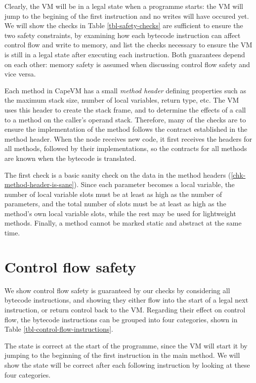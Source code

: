 Clearly, the VM will be in a legal state when a programme starts: the VM will jump to the begining of the first instruction and no writes will have occured yet. We will show the checks in Table \ref{tbl-safety-checks} are sufficient to ensure the two safety constraints, by examining how each bytecode instruction can affect control flow and write to memory, and list the checks necessary to ensure the VM is still in a legal state after executing each instruction. Both guarantees depend on each other: memory safety is assumed when discussing control flow safety and vice versa.

Each method in CapeVM has a small \emph{method header} defining properties such as the maximum stack size, number of local variables, return type, etc. The VM uses this header to create the stack frame, and to determine the effects of a call to a method on the caller's operand stack. Therefore, many of the checks are to ensure the implementation of the method follows the contract established in the method header. When the node receives new code, it first receives the headers for all methods, followed by their implementations, so the contracts for all methods are known when the bytecode is translated.

The first check is a basic sanity check on the data in the method headers (\ref{chk-method-header-is-sane}). Since each parameter becomes a local variable, the number of local variable slots must be at least as high as the number of parameters, and the total number of slots must be at least as high as the method's own local variable slots, while the rest may be used for lightweight methods. Finally, a method cannot be marked static and abstract at the same time.

\section{Control flow safety}
We show control flow safety is guaranteed by our checks by considering all bytecode instructions, and showing they either flow into the start of a legal next instruction, or return control back to the VM. Regarding their effect on control flow, the bytecode instructions can be grouped into four categories, shown in Table \ref{tbl-control-flow-instructions}.

The state is correct at the start of the programme, since the VM will start it by jumping to the beginning of the first instruction in the main method. We will show the state will be correct after each following instruction by looking at these four categories.

